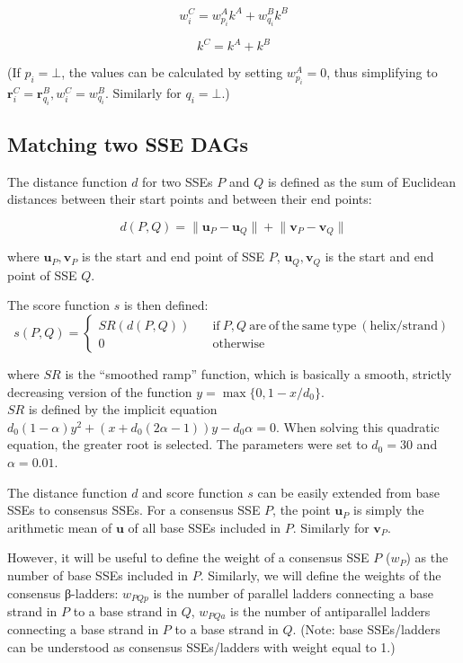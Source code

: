\documentclass{article}
\begin{document}
\[  w^C_i = w^A_{p_i} k^A + w^B_{q_i} k^B  \]

\[  k^C = k^A + k^B  \]

(If \(p_i=\bot\), the values can be calculated by setting
\(w^A_{p_i} = 0\), thus simplifying to
\(\mathbf{r}^C_i = \mathbf{r}^B_{q_i}, w^C_i = w^B_{q_i}\). Similarly for \(q_i=\bot\).)




\subsection{Matching two SSE DAGs}
\label{sec:appendix_matching_dags}

The distance function \(d\) for two SSEs \(P\) and \(Q\) is defined 
as the sum of Euclidean distances between their start points and between their end points:

\[  d(P, Q) = \lVert \mathbf{u}_P - \mathbf{u}_Q \rVert + \lVert \mathbf{v}_P - \mathbf{v}_Q \rVert  \]

where \(\mathbf{u}_P, \mathbf{v}_P\) is the start and end point of SSE \(P\), 
\(\mathbf{u}_Q, \mathbf{v}_Q\) is the start and end point of SSE \(Q\).

The score function \(s\) is then defined:
\[
  s(P, Q) = \begin{cases}
              SR(d(P, Q)) \quad & \mathrm{if}\ P, Q\ \mathrm{are\ of\ the\ same\ type\ (helix/strand)} \\
              0           \quad & \mathrm{otherwise}
            \end{cases}
\]

where \(SR\) is the ``smoothed ramp'' function, which is basically 
a smooth, strictly decreasing version of the function \(y = \max\{0, 1 - x/d_0\} \). \\
\(SR\) is defined by the implicit equation 
\(  d_0 (1 - \alpha) y^2 + (x + d_0 (2\alpha - 1)) y - d_0 \alpha = 0  \).
When solving this quadratic equation, the greater root is selected.
The parameters were set to \(d_0 = 30\) and \(\alpha = 0.01\).

The distance function \(d\) and score function \(s\) can be easily 
extended from base SSEs to consensus SSEs. 
For a consensus SSE \(P\), the point \(\mathbf{u}_P\) is simply 
the arithmetic mean of \(\mathbf{u}\) of all base SSEs included in \(P\).
Similarly for \(\mathbf{v}_P\).

However, it will be useful to define the weight of a consensus SSE \(P\) (\(w_P\)) 
as the number of base SSEs included in \(P\).
Similarly, we will define the weights of the consensus β-ladders:
\(w_{PQp}\) is the number of parallel ladders connecting 
a base strand in \(P\) to a base strand in \(Q\),
\(w_{PQa}\) is the number of antiparallel ladders connecting 
a base strand in \(P\) to a base strand in \(Q\). 
(Note: base SSEs/ladders can be understood as consensus SSEs/ladders with weight equal to 1.)
\end{document}
